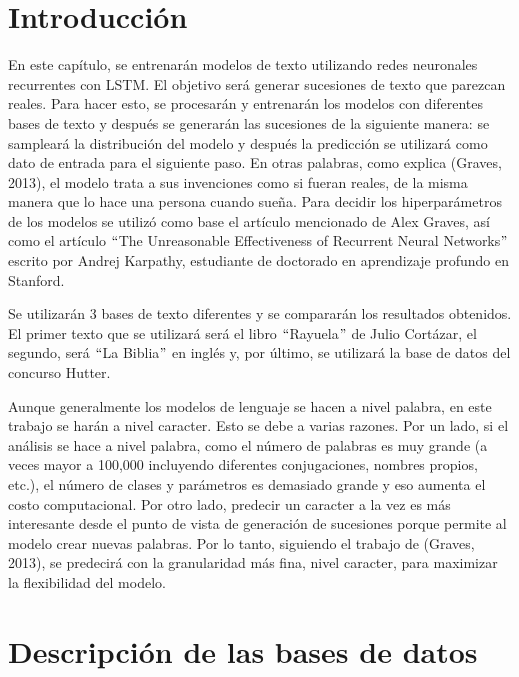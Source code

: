 \section{Introducción}
En este capítulo, se entrenarán modelos de texto utilizando redes neuronales recurrentes con LSTM. El objetivo será generar sucesiones de texto que parezcan reales. Para hacer esto, se procesarán y entrenarán los modelos con diferentes bases de texto y después se generarán las sucesiones de la siguiente manera: se sampleará la distribución del modelo y después la predicción se utilizará como dato de entrada para el siguiente paso. En otras palabras, como explica (Graves, 2013), el modelo trata a sus invenciones como si fueran reales, de la misma manera que lo hace una persona cuando sueña. Para decidir los hiperparámetros de los modelos se utilizó como base el artículo mencionado de Alex Graves, así como el artículo $``$The Unreasonable Effectiveness of Recurrent Neural Networks$"$ escrito por Andrej Karpathy, estudiante de doctorado en aprendizaje profundo en Stanford.
\cite{DBLP:journals/corr/Graves13}
\cite{unreasonable}

\vspace{1em}

Se utilizarán 3 bases de texto diferentes y se compararán los resultados obtenidos. El primer texto que se utilizará será el libro $``$Rayuela$"$ de Julio Cortázar, el segundo, será $``$La Biblia$"$ en inglés y, por último, se utilizará la base de datos del concurso Hutter.

\vspace{1em}

Aunque generalmente los modelos de lenguaje se hacen a nivel palabra, en este trabajo se harán a nivel caracter. Esto se debe a varias razones. Por un lado, si el análisis se hace a nivel palabra, como el número de palabras es muy grande (a veces mayor a 100,000 incluyendo diferentes conjugaciones, nombres propios, etc.), el número de clases y parámetros es demasiado grande y eso aumenta el costo computacional. Por otro lado, predecir un caracter a la vez es más interesante desde el punto de vista de generación de sucesiones porque permite al modelo crear nuevas palabras. Por lo tanto, siguiendo el trabajo de (Graves, 2013), se predecirá con la granularidad más fina, nivel caracter, para maximizar la flexibilidad del modelo.
\cite{DBLP:journals/corr/Graves13}

\section{Descripción de las bases de datos}

